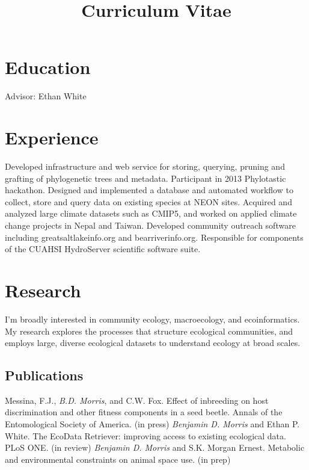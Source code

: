 \documentclass[11pt,letter]{moderncv}
\title{Curriculum Vitae}
\begin{document}
\maketitle


\section{Education}
 {Advisor: Ethan White}


\section{Experience}
{Developed infrastructure and web service for storing, querying, pruning and grafting of phylogenetic trees and metadata. Participant in 2013 Phylotastic hackathon.}
{Designed and implemented a database and automated workflow to collect, store and query data on existing species at NEON sites.}
{Acquired and analyzed large climate datasets such as CMIP5, and worked on applied climate change projects in Nepal and Taiwan.}
{Developed community outreach software including greatsaltlakeinfo.org and bearriverinfo.org. Responsible for components of the CUAHSI HydroServer scientific software suite.}


\section{Research}
\cvline{}
{I'm broadly interested in community ecology, macroecology, and ecoinformatics. My research explores the processes that structure ecological communities, and employs large, diverse ecological datasets to understand ecology at broad scales.}


\subsection{Publications}
 {
    Messina, F.J., \emph{B.D. Morris}, and C.W. Fox. Effect of inbreeding on host discrimination and other fitness components in a seed beetle. Annals of the Entomological Society of America. (in press)
}
 {
    \emph{Benjamin D. Morris} and Ethan P. White. The EcoData Retriever: improving access to existing ecological data. PLoS ONE. (in review)
}
\cvline{} {
    \emph{Benjamin D. Morris} and S.K. Morgan Ernest. Metabolic and environmental constraints on animal space use. (in prep)
}
\end{document}
